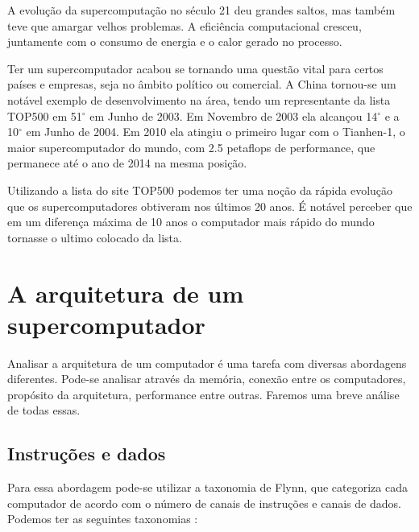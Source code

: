 \documentclass[a4paper]{article}
\begin{document}
A evolução da supercomputação no século 21 deu grandes saltos, mas também teve que amargar velhos problemas. A eficiência computacional cresceu, juntamente com o consumo de energia e o calor gerado no processo.

Ter um supercomputador acabou se tornando uma questão vital para certos países e empresas, seja no âmbito político ou comercial. A China tornou-se um notável exemplo  de desenvolvimento na área, tendo um representante da lista TOP500 em 51$^{\circ}$ em Junho de 2003. Em Novembro de 2003 ela alcançou 14$^{\circ}$ e a 10$^{\circ}$ em Junho de 2004. Em 2010 ela atingiu o primeiro lugar com o Tianhen-1, o maior supercomputador do mundo, com 2.5 petaflops de performance, que permanece até o ano de 2014 na mesma posição.

Utilizando a lista do site TOP500 podemos ter uma noção da rápida evolução que os supercomputadores obtiveram nos últimos 20 anos. É notável perceber que em um diferença máxima de 10 anos o computador mais rápido do mundo tornasse o ultimo colocado da lista.

\section{A arquitetura de um supercomputador}

Analisar a arquitetura de um computador é uma tarefa com diversas abordagens diferentes. Pode-se analisar através da memória, conexão entre os computadores, propósito da arquitetura, performance entre outras. Faremos uma breve análise de todas essas.

\subsection{Instruções e dados}
Para essa abordagem pode-se utilizar a taxonomia de Flynn, que categoriza cada computador de acordo com o número de canais de instruções e canais de dados. Podemos ter as seguintes taxonomias : 
\end{document}
